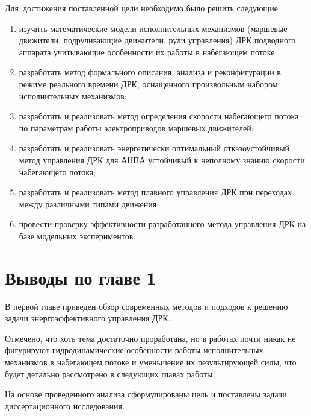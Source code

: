Для~достижения поставленной цели необходимо было решить следующие {\tasks}:
\begin{enumerate}[beginpenalty=10000] %
  \item изучить математические модели исполнительных механизмов (маршевые движители, подруливающие движители, рули управления) ДРК подводного аппарата учитывающие особенности их работы в набегающем потоке;
  \item разработать метод формального описания, анализа и реконфигурации в режиме реального времени ДРК, оснащенного произвольным набором исполнительных механизмов;
  \item разработать и реализовать метод определения скорости набегающего потока по параметрам работы электроприводов маршевых движителей;
  \item разработать и реализовать энергетически оптимальный отказоустойчивый метод управления ДРК для АНПА устойчивый к неполному знанию скорости набегающего потока;
  \item разработать и реализовать метод плавного управления ДРК при переходах между различными типами движения;
  \item провести проверку эффективности разработанного метода управления ДРК на базе модельных экспериментов.
\end{enumerate}

\section{Выводы по главе 1}\label{sec:Statement/Conclusion}
В первой главе приведен обзор современных методов и подходов к решению задачи энергоэффективного управления ДРК.

Отмечено, что хоть тема достаточно проработана, но в работах почти никак не фигурируют гидродинамические особенности работы исполнительных механизмов в набегающем потоке и уменьшение их результирующей силы, что будет детально рассмотрено в следующих главах работы.

На основе проведенного анализа сформулированы цель и поставлены задачи диссертационного исследования.